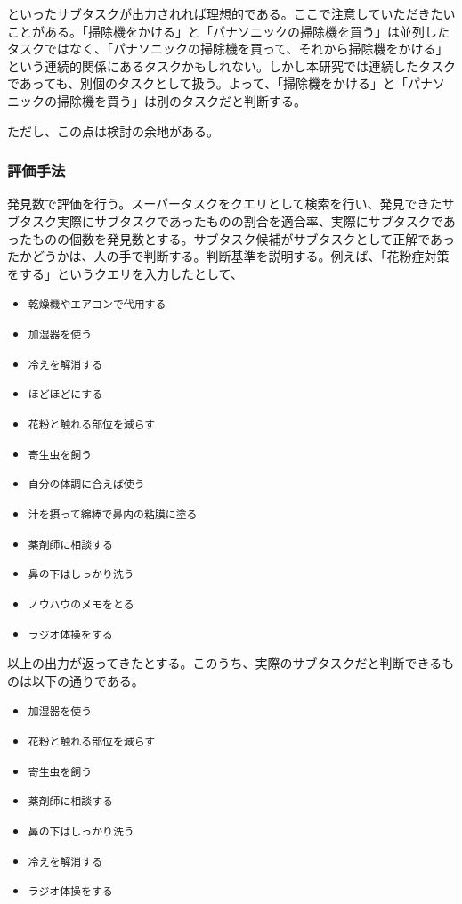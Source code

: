 \documentclass[submit,techreq]{ipsj}
\def\|{\verb|}
\begin{document}
といったサブタスクが出力されれば理想的である。ここで注意していただきたいことがある。「掃除機をかける」と「パナソニックの掃除機を買う」は並列したタスクではなく、「パナソニックの掃除機を買って、それから掃除機をかける」という連続的関係にあるタスクかもしれない。しかし本研究では連続したタスクであっても、別個のタスクとして扱う。よって、「掃除機をかける」と「パナソニックの掃除機を買う」は別のタスクだと判断する。

ただし、この点は検討の余地がある。


%5.1.4
\subsubsection{評価手法}
発見数で評価を行う。スーパータスクをクエリとして検索を行い、発見できたサブタスク実際にサブタスクであったものの割合を適合率、実際にサブタスクであったものの個数を発見数とする。サブタスク候補がサブタスクとして正解であったかどうかは、人の手で判断する。判断基準を説明する。例えば、「花粉症対策をする」というクエリを入力したとして、

\begin{itemize}
\item \|乾燥機やエアコンで代用する|
\item \|加湿器を使う|
\item \|冷えを解消する|
\item \|ほどほどにする|
\item \|花粉と触れる部位を減らす|
\item \|寄生虫を飼う|
\item \|自分の体調に合えば使う|
\item \|汁を摂って綿棒で鼻内の粘膜に塗る|
\item \|薬剤師に相談する|
\item \|鼻の下はしっかり洗う|
\item \|ノウハウのメモをとる|
\item \|ラジオ体操をする|
\end{itemize}

以上の出力が返ってきたとする。このうち、実際のサブタスクだと判断できるものは以下の通りである。

\begin{itemize}
\item \|加湿器を使う|
\item \|花粉と触れる部位を減らす|
\item \|寄生虫を飼う|
\item \|薬剤師に相談する|
\item \|鼻の下はしっかり洗う|
\item \|冷えを解消する|
\item \|ラジオ体操をする|
\end{itemize}
\end{document}
